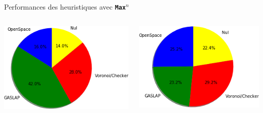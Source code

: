     \begin{frame}{Performances des heuristiques avec \textbf{\texttt{Max$^n$}}}
        \begin{columns}
            \begin{column}{0.5\textwidth}
                \includegraphics[scale=0.5]{Images/ProporitionVictoireHeuristiqueWithParanoid.png}
            \end{column}
            \begin{column}{0.5\textwidth}
                \includegraphics[scale=0.5]{Images/ProportionDureePartieGagnanteWithParanoid.png}
            \end{column}
        \end{columns}
    \end{frame}



